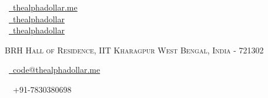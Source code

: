 \documentclass[a4paper,10pt]{extarticle} %
\begin{document}
\pagestyle{empty} %


\begin{multicols}{3}
\normalsize  \faGlobe\ {\href{https://thealphadollar.me/}{\  thealphadollar.me}}\\
\normalsize \faGithub\ {\href{https://github.com/thealphadollar}{\  thealphadollar}}\\
\normalsize  \faLinkedinSquare\ {\href{https://www.linkedin.com/in/thealphadollar}{\  thealphadollar}}\\
\columnbreak
\normalsize\par{\centering{\huge\textsc{\textcolor{primary}{Shivam Kumar Jha}}}\par} %
\par{\centering\normalsize {\textsc{BRH Hall of Residence, IIT Kharagpur West Bengal, India - 721302}}\hfill\par}
\columnbreak
\raggedright\hfill\normalsize \faEnvelope\ {\href{mailto:code@thealphadollar.me}{\  code@thealphadollar.me}}\\
\raggedright\hfill{\faPhone\ \  +91-7830380698}
\end{multicols}
\vspace{-0.4 cm}

\end{document}
